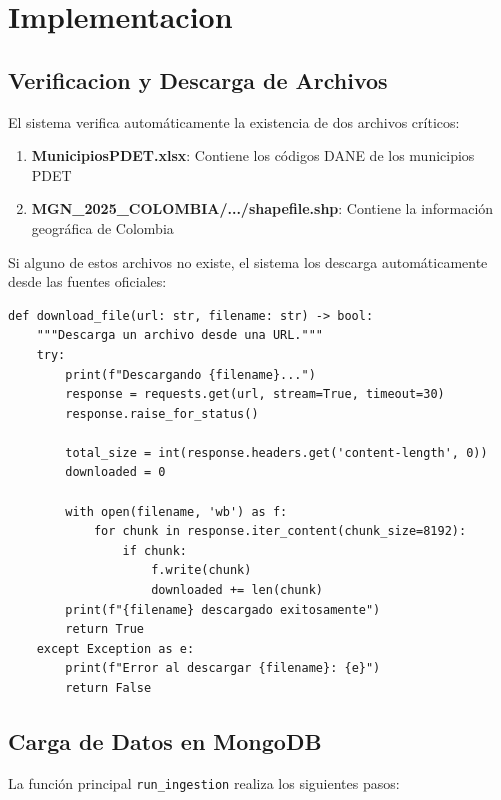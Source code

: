 \documentclass[12pt,a4paper]{article}
\begin{document}
\section{Implementacion}

\subsection{Verificacion y Descarga de Archivos}

El sistema verifica automáticamente la existencia de dos archivos críticos:

\begin{enumerate}
  \item \textbf{MunicipiosPDET.xlsx}: Contiene los códigos DANE de los municipios PDET
  \item \textbf{MGN\_2025\_COLOMBIA/.../shapefile.shp}: Contiene la información geográfica de Colombia
\end{enumerate}

Si alguno de estos archivos no existe, el sistema los descarga automáticamente desde las fuentes oficiales:

\begin{lstlisting}[caption=Descarga automática de archivos]
def download_file(url: str, filename: str) -> bool:
    """Descarga un archivo desde una URL."""
    try:
        print(f"Descargando {filename}...")
        response = requests.get(url, stream=True, timeout=30)
        response.raise_for_status()
        
        total_size = int(response.headers.get('content-length', 0))
        downloaded = 0
        
        with open(filename, 'wb') as f:
            for chunk in response.iter_content(chunk_size=8192):
                if chunk:
                    f.write(chunk)
                    downloaded += len(chunk)
        print(f"{filename} descargado exitosamente")
        return True
    except Exception as e:
        print(f"Error al descargar {filename}: {e}")
        return False
\end{lstlisting}

\subsection{Carga de Datos en MongoDB}

La función principal \texttt{run\_ingestion} realiza los siguientes pasos:
\end{document}

